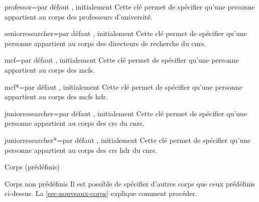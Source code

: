 \begin{docKey}{professor}{=\textbar{}}{par défaut
    , initialement }
  Cette clé permet de spécifier qu'une personne appartient au corps des
  professeurs d'université.
\end{docKey}
%
\begin{docKey}{seniorresearcher}{=\textbar{}}{par
    défaut , initialement }
  Cette clé permet de spécifier qu'une personne appartient au corps des
  directeurs de recherche du \gls{cnrs}.
\end{docKey}
%
\begin{docKey}{mcf}{=\textbar{}}{par défaut
    , initialement }
  Cette clé permet de spécifier qu'une personne appartient au corps des
  \glspl{mcf}.
\end{docKey}
%
\begin{docKey}{mcf*}{=\textbar{}}{par défaut
    , initialement }
  Cette clé permet de spécifier qu'une personne appartient au corps des
  \glspl{mcf} \gls{hdr}.
\end{docKey}
%
\begin{docKey}{juniorresearcher}{=\textbar{}}{par
    défaut , initialement }
  Cette clé permet de spécifier qu'une personne appartient au corps des
  \glspl{cr} du \gls{cnrs}.
\end{docKey}
%
\begin{docKey}{juniorresearcher*}{=\textbar{}}{par
    défaut , initialement }
  Cette clé permet de spécifier qu'une personne appartient au corps des
  \glspl{cr} \gls{hdr} du \gls{cnrs}.
\end{docKey}
%
\begin{dbexample}{Corps (prédéfinis)}{}
\begin{bodycode}
%
%
\end{bodycode}
\end{dbexample}
%
\begin{dbremark}{Corps non prédéfinis}{}
  Il est possible de spécifier d'autres corps que ceux prédéfinis ci-dessus. La
  \vref{sec-nouveaux-corps} explique comment procéder.
\end{dbremark}
